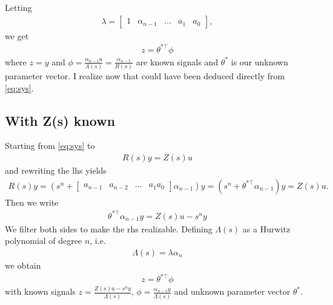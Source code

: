 \documentclass[]{article}
\begin{document}
Letting
\begin{equation}\begin{aligned}
\lambda =
\begin{bmatrix}
1 & \alpha_{n-1} & \dots & a_1 & a_0
\end{bmatrix},
\end{aligned}\end{equation}
we get
\begin{equation}\begin{aligned}
z = \theta^{*\top} \phi
\end{aligned}\end{equation}
where $z=y$ and $\phi = \frac{\alpha_{n-1}u}{\Lambda(s)} = \frac{\alpha_{n-1}}{R(s)}$ are known signals and $\theta^*$ is our unknown parameter vector. I realize now that could have been deduced directly from \eqref{eq:sys}.

\subsection{With Z(s) known}
Starting from  \eqref{eq:sys} to
\begin{equation}\begin{aligned}
R(s)y = Z(s)u
\end{aligned}\end{equation}
and rewriting the lhs yields
\begin{equation}\begin{aligned}
R(s)y =
(s^n +
\begin{bmatrix}
a_{n-1} & a_{n-2} & \dots & a_1 a_0
\end{bmatrix}
\alpha_{n-1})y
= (s^n + \theta^{*\top}\alpha_{n-1})y
= Z(s)u.
\end{aligned}\end{equation}
Then we write
\begin{equation}\begin{aligned}
\theta^{*\top}\alpha_{n-1}y
= Z(s)u - s^ny
\end{aligned}\end{equation}
We filter both sides to make the rhs realizable. Defining $\Lambda(s)$ as a Hurwitz polynomial of degree $n$, i.e.
\begin{equation}\begin{aligned}
\Lambda(s) = \lambda\alpha_{n}
\end{aligned}\end{equation}
we obtain
\begin{equation}\begin{aligned}
z = \theta^{*\top} \phi
\end{aligned}\end{equation}
with known signals $z = \frac{Z(s)u - s^ny}{\Lambda(s)}$, $\phi = \frac{\alpha_{n-1} y}{\Lambda(s)}$ and unknown parameter vector $\theta^*$.
\end{document}
